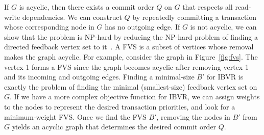 If $G$ is acyclic, then there exists a commit order $Q$ on $G$ that respects all read-write dependencies. We can construct $Q$ by repeatedly committing a transaction whose corresponding node in $G$ has no outgoing edge. If $G$ is not acyclic, we can show that the problem is NP-hard by reducing the NP-hard problem of finding a directed feedback vertex set to it~\cite{karp1972reducibility}. 
A FVS is a subset of vertices whose removal makes the graph acyclic. For example, consider the graph in Figure~\ref{fig:fvs}. The vertex 1 forms a FVS since the graph becomes acyclic after removing vertex 1 and its incoming and outgoing edges. Finding a minimal-size $B'$ for IBVR is exactly the problem of finding the minimal (smallest-size) feedback vertex set on $G$. If we have a more complex objective function for IBVR, we can assign weights to the nodes to represent the desired transaction priorities, and look for a minimum-weight FVS. 
Once we find the FVS $B'$, removing the nodes in $B'$ from $G$ yields an acyclic graph that determines the desired commit order $Q$.


